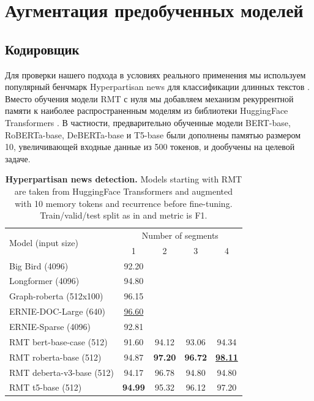\chapter{Аугментация предобученных моделей}\label{ch:ch3}

\section{Кодировщик}\label{sec:ch3/sect1}

Для проверки нашего подхода в условиях реального применения мы используем популярный бенчмарк Hyperpartisan news для классификации длинных текстов \cite{kiesel2019semeval}. Вместо обучения модели RMT с нуля мы добавляем механизм рекуррентной памяти к наиболее распространенным моделям из библиотеки HuggingFace Transformers \cite{wolf2020transformers}. В частности, предварительно обученные модели BERT-base, RoBERTa-base, DeBERTa-base и T5-base были дополнены памятью размером 10, увеличивающей входные данные из 500 токенов, и дообучены на целевой задаче.

\begin{table}
\centering
\begin{tabular}{lcccc}
\hline
\multirow{2}{*}{Model (input size)} & \multicolumn{4}{c}{Number of segments} \\
                                    & 1         & 2         & 3         & 4         \\
\hline
Big Bird (4096) \cite{zaheer2020big} & 92.20     &           &           &           \\
Longformer (4096) \cite{beltagy2020longformer} & 94.80     &           &           &           \\
Graph-roberta (512x100) \cite{xu2021contrastive} & 96.15     &           &           &           \\
ERNIE-DOC-Large (640) \cite{ding-etal-2021-ernie-doc} & \underline{96.60} &           &           &           \\
ERNIE-Sparse (4096) \cite{liu2022ernie} & 92.81     &           &           &           \\
\hline
RMT bert-base-case (512) & 91.60 & 94.12 & 93.06 & 94.34 \\
RMT roberta-base (512) & 94.87 & \textbf{97.20} & \textbf{96.72} & \underline{\textbf{98.11}} \\
RMT deberta-v3-base (512) & 94.17 & 96.78 & 94.80 & 94.80 \\
RMT t5-base (512) & \textbf{94.99} & 95.32 & 96.12 & 97.20 \\
\hline
\end{tabular}
\caption{\textbf{Hyperpartisan news detection.} Models starting with RMT are taken from HuggingFace Transformers and augmented with 10 memory tokens and recurrence before fine-tuning. Train/valid/test split as in \cite{beltagy2020longformer} and metric is F1.}
\label{tab:hyp}
\end{table}    


